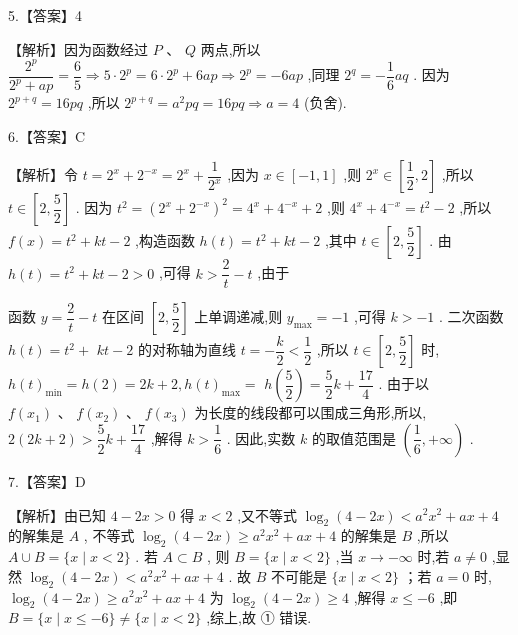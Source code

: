 \documentclass[10pt]{article}
\begin{document}
5.【答案】4

【解析】因为函数经过 $P\text{ 、 }Q$ 两点,所以 $\dfrac{{2}^{p}}{{2}^{p} + {ap}} = \dfrac{6}{5} \Rightarrow  5 \cdot  {2}^{p} = 6 \cdot  {2}^{p} + {6ap} \Rightarrow  {2}^{p} =  - {6ap}$ ,同理 ${2}^{q} =  - \dfrac{1}{6}{aq}$ . 因为 ${2}^{p + q} = {16pq}$ ,所以 ${2}^{p + q} = {a}^{2}{pq} = {16pq} \Rightarrow  a = 4$ (负舍).

6.【答案】C

【解析】令 $t = {2}^{x} + {2}^{-x} = {2}^{x} + \dfrac{1}{{2}^{x}}$ ,因为 $x \in  \left\lbrack  {-1,1}\right\rbrack$ ,则 ${2}^{x} \in  \left\lbrack  {\dfrac{1}{2},2}\right\rbrack$ ,所以 $t \in  \left\lbrack  {2,\dfrac{5}{2}}\right\rbrack$ . 因为 ${t}^{2} = {\left( {2}^{x} + {2}^{-x}\right) }^{2} = {4}^{x} + {4}^{-x} + 2$ ,则 ${4}^{x} + {4}^{-x} = {t}^{2} - 2$ ,所以 $f\left( x\right)  = {t}^{2} + {kt} - 2$ ,构造函数 $h\left( t\right)  = {t}^{2} + {kt} - 2$ ,其中 $t \in  \left\lbrack  {2,\dfrac{5}{2}}\right\rbrack$ . 由 $h\left( t\right)  = {t}^{2} + {kt} - 2 > 0$ ,可得 $k > \dfrac{2}{t} - t$ ,由于

函数 $y = \dfrac{2}{t} - t$ 在区间 $\left\lbrack  {2,\dfrac{5}{2}}\right\rbrack$ 上单调递减,则 ${y}_{\max } =  - 1$ ,可得 $k >  - 1$ . 二次函数 $h\left( t\right)  = {t}^{2} +$  ${kt} - 2$ 的对称轴为直线 $t =  - \dfrac{k}{2} < \dfrac{1}{2}$ ,所以 $t \in  \left\lbrack  {2,\dfrac{5}{2}}\right\rbrack$ 时, $h{\left( t\right) }_{\min } = h\left( 2\right)  = {2k} + 2,h{\left( t\right) }_{\max } =$  $h\left( \dfrac{5}{2}\right)  = \dfrac{5}{2}k + \dfrac{17}{4}$ . 由于以 $f\left( {x}_{1}\right) \text{ 、 }f\left( {x}_{2}\right) \text{ 、 }f\left( {x}_{3}\right)$ 为长度的线段都可以围成三角形,所以, $2\left( {{2k} + 2}\right)  > \dfrac{5}{2}k + \dfrac{17}{4}$ ,解得 $k > \dfrac{1}{6}$ . 因此,实数 $k$ 的取值范围是 $\left( {\dfrac{1}{6}, + \infty }\right)$ .

7.【答案】D

【解析】由已知 $4 - {2x} > 0$ 得 $x < 2$ ,又不等式 ${\log }_{2}\left( {4 - {2x}}\right)  < {a}^{2}{x}^{2} + {ax} + 4$ 的解集是 $A$ , 不等式 ${\log }_{2}\left( {4 - {2x}}\right)  \geq  {a}^{2}{x}^{2} + {ax} + 4$ 的解集是 $B$ ,所以 $A \cup  B = \{ x \mid  x < 2\}$ . 若 $A \subset  B$ , 则 $B = \{ x \mid  x < 2\}$ ,当 $x \rightarrow   - \infty$ 时,若 $a \neq  0$ ,显然 ${\log }_{2}\left( {4 - {2x}}\right)  < {a}^{2}{x}^{2} + {ax} + 4$ . 故 $B$ 不可能是 $\{ x \mid  x < 2\}$ ；若 $a = 0$ 时, ${\log }_{2}\left( {4 - {2x}}\right)  \geq  {a}^{2}{x}^{2} + {ax} + 4$ 为 ${\log }_{2}\left( {4 - {2x}}\right)  \geq  4$ ,解得 $x \leq   - 6$ ,即 $B = \{ x \mid  x \leq   - 6\}  \neq  \{ x \mid  x < 2\}$ ,综上,故 ① 错误.
\end{document}
